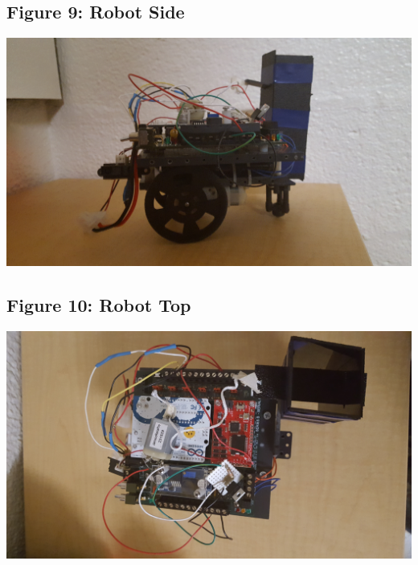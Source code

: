 \documentclass{article}
\begin{document}
\subsection{Figure 9: Robot Side}
\begin{center}{ \includegraphics[width=\textwidth]{RobotSide.jpg}}\end{center}

\subsection{Figure 10: Robot Top}
\begin{center}{ \includegraphics[width=\textwidth]{RobotTop.jpg}}\end{center}
\end{document}
